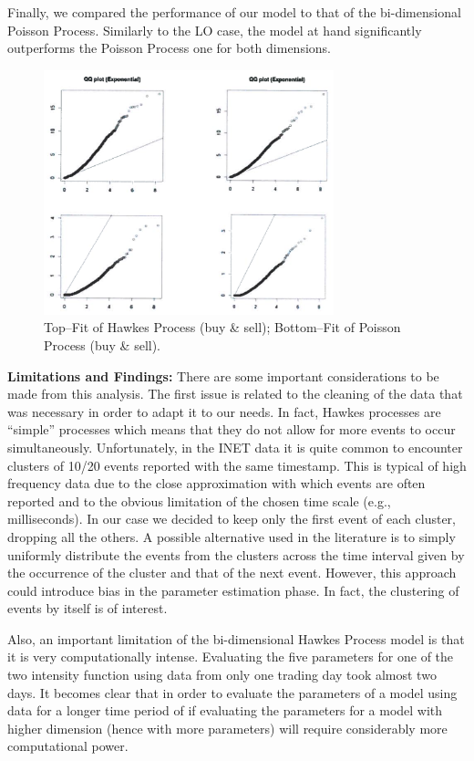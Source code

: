 Finally, we compared the performance of our model to that of the bi-dimensional Poisson Process. Similarly to the LO case, the model at hand significantly outperforms the Poisson Process one for both dimensions. \twomedskip
	\begin{figure}[!ht]
   	\centering
   	\includegraphics[width=0.75\textwidth]{chapters/chapter_trade_data_models/figures/4fig.png} 
   	\caption{Top--Fit of Hawkes Process (buy \& sell); Bottom--Fit of Poisson Process (buy \& sell).\label{fig:4fig6}}
	\end{figure}


\noindent\textbf{Limitations and Findings:} There are some important considerations to be made from this analysis. The first issue is related to the cleaning of the data that was necessary in order to adapt it to our needs. In fact, Hawkes processes are ``simple'' processes which means that they do not allow for more events to occur simultaneously. Unfortunately, in the INET data it is quite common to encounter clusters of 10/20 events reported with the same timestamp. This is typical of high frequency data due to the close approximation with which events are often reported and to the obvious limitation of the chosen time scale (e.g., milliseconds). In our case we decided to keep only the first event of each cluster, dropping all the others. A possible alternative used in the literature is to simply uniformly distribute the events from the clusters across the time interval given by the occurrence of the cluster and that of the next event. However, this approach could introduce bias in the parameter estimation phase. In fact, the clustering of events by itself is of interest.


Also, an important limitation of the bi-dimensional Hawkes Process model is that it is very computationally intense. Evaluating the five parameters for one of the two intensity function using data from only one trading day took almost two days. It becomes clear that in order to evaluate the parameters of a model using data for a longer time period of if evaluating the parameters for a model with higher dimension (hence with more parameters) will require considerably more computational power. 


